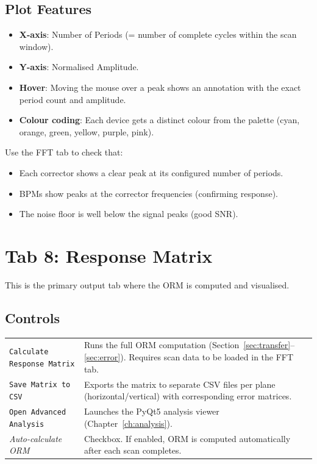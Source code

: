 \documentclass[11pt,a4paper,twoside]{report}
\newcommand{\btn}[1]{\colorbox{accent!12}{\texttt{\small #1}}}
\newcommand{\field}[1]{\textit{#1}}
\begin{document}
\subsection{Plot Features}

\begin{itemize}
  \item \textbf{X-axis}: Number of Periods (= number of complete cycles within the scan window).
  \item \textbf{Y-axis}: Normalised Amplitude.
  \item \textbf{Hover}: Moving the mouse over a peak shows an annotation with the exact period count and amplitude.
  \item \textbf{Colour coding}: Each device gets a distinct colour from the palette (cyan, orange, green, yellow, purple, pink).
\end{itemize}

\begin{notebox}
Use the FFT tab to check that:
\begin{itemize}
  \item Each corrector shows a clear peak at its configured number of periods.
  \item BPMs show peaks at the corrector frequencies (confirming response).
  \item The noise floor is well below the signal peaks (good SNR).
\end{itemize}
\end{notebox}

\section{Tab 8: Response Matrix}\label{sec:tab8}

This is the primary output tab where the ORM is computed and visualised.

\subsection{Controls}

\begin{tabularx}{\textwidth}{lX}
  \toprule
  \btn{Calculate Response Matrix}  & Runs the full ORM computation (Section~\ref{sec:transfer}--\ref{sec:error}). Requires scan data to be loaded in the FFT tab. \\
  \btn{Save Matrix to CSV}          & Exports the matrix to separate CSV files per plane (horizontal/vertical) with corresponding error matrices. \\
  \btn{Open Advanced Analysis}       & Launches the PyQt5 analysis viewer (Chapter~\ref{ch:analysis}). \\
  \field{Auto-calculate ORM}         & Checkbox. If enabled, ORM is computed automatically after each scan completes. \\
  \bottomrule
\end{tabularx}
\end{document}
